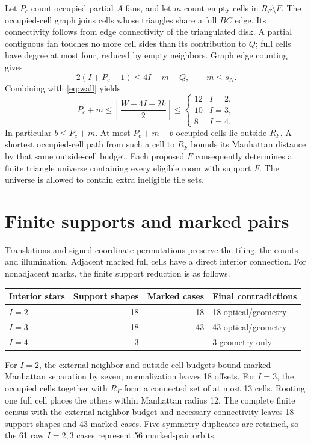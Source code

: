 \documentclass[11pt]{article}
\theoremstyle{definition}
\begin{document}
Let $P_c$ count occupied partial $A$ fans, and let $m$ count empty cells in $R_F\setminus F$. The occupied-cell graph joins cells whose triangles share a full $BC$ edge. Its connectivity follows from edge connectivity of the triangulated disk. A partial contiguous fan touches no more cell sides than its contribution to $Q$; full cells have degree at most four, reduced by empty neighbors. Graph edge counting gives
\[
 2(I+P_c-1)\le4I-m+Q,\qquad m\le s_N.
\]
Combining with \eqref{eq:wall} yields
\begin{equation}\label{eq:budget}
 P_c+m\le\left\lfloor\frac{W-4I+2k}{2}\right\rfloor
 \le\begin{cases}12&I=2,\\10&I=3,\\8&I=4.\end{cases}
\end{equation}
In particular $b\le P_c+m$. At most $P_c+m-b$ occupied cells lie outside $R_F$. A shortest occupied-cell path from such a cell to $R_F$ bounds its Manhattan distance by that same outside-cell budget. Each proposed $F$ consequently determines a finite triangle universe containing every eligible room with support $F$. The universe is allowed to contain extra ineligible tile sets.

\section{Finite supports and marked pairs}\label{sec:supports}
Translations and signed coordinate permutations preserve the tiling, the counts and illumination. Adjacent marked full cells have a direct interior connection. For nonadjacent marks, the finite support reduction is as follows.

\begin{center}
\begin{tabular}{@{}lrrl@{}}\toprule
Interior stars & Support shapes & Marked cases & Final contradictions\\\midrule
$I=2$ &18&18&18 optical/geometry\\
$I=3$ &18&43&43 optical/geometry\\
$I=4$ &3&---&3 geometry only\\\bottomrule
\end{tabular}
\end{center}

For $I=2$, the external-neighbor and outside-cell budgets bound marked Manhattan separation by seven; normalization leaves 18 offsets. For $I=3$, the occupied cells together with $R_F$ form a connected set of at most 13 cells. Rooting one full cell places the others within Manhattan radius 12. The complete finite census with the external-neighbor budget and necessary connectivity leaves 18 support shapes and 43 marked cases. Five symmetry duplicates are retained, so the 61 raw $I=2,3$ cases represent 56 marked-pair orbits.
\end{document}
